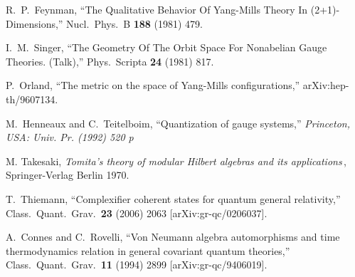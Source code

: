 \documentclass[12pt]{article}
\begin{document}
\begin{thebibliography}{99}
  R.~P.~Feynman,
  ``The Qualitative Behavior Of Yang-Mills Theory In (2+1)-Dimensions,''
  Nucl.\ Phys.\  B {\bf 188} (1981) 479.

  I.~M.~Singer,
  ``The Geometry Of The Orbit Space For Nonabelian Gauge Theories. (Talk),''
  Phys.\ Scripta {\bf 24} (1981) 817.

  P.~Orland,
  ``The metric on the space of Yang-Mills configurations,''
  arXiv:hep-th/9607134.


  M.~Henneaux and C.~Teitelboim,
  ``Quantization of gauge systems,''
{\it  Princeton, USA: Univ. Pr. (1992) 520 p}



M. Takesaki, {\it Tomita's theory of modular Hilbert algebras and
its applications\,}, Springer-Verlag Berlin 1970.


































  T.~Thiemann,
  ``Complexifier coherent states for quantum general relativity,''
  Class.\ Quant.\ Grav.\  {\bf 23} (2006) 2063
  [arXiv:gr-qc/0206037].







  A.~Connes and C.~Rovelli,
  ``Von Neumann algebra automorphisms and time thermodynamics relation in
  general covariant quantum theories,''
  Class.\ Quant.\ Grav.\  {\bf 11} (1994) 2899
  [arXiv:gr-qc/9406019].




\end{thebibliography}
\end{document}
